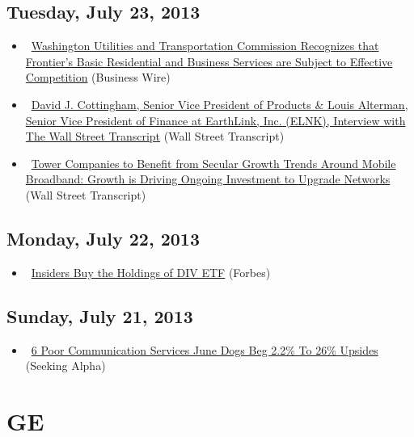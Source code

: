 \documentclass[11pt,asymmetric]{article}
\begin{document}
\subsection*{Tuesday, July 23, 2013}
\begin{itemize}
\item\ \href{http://finance.yahoo.com/news/washington-utilities-transportation-commission-recognizes-184800114.html}{Washington Utilities and Transportation Commission Recognizes that Frontier’s Basic Residential and Business Services are Subject to Effective Competition} (Business Wire)
\item\ \href{http://finance.yahoo.com/news/david-j-cottingham-senior-vice-164600236.html}{David J. Cottingham, Senior Vice President of Products \& Louis Alterman, Senior Vice President of Finance at EarthLink, Inc. (ELNK), Interview with The Wall Street Transcript} (Wall Street Transcript)
\item\ \href{http://finance.yahoo.com/news/tower-companies-benefit-secular-growth-155300700.html}{Tower Companies to Benefit from Secular Growth Trends Around Mobile Broadband: Growth is Driving Ongoing Investment to Upgrade Networks} (Wall Street Transcript)
\end{itemize}
\subsection*{Monday, July 22, 2013}
\begin{itemize}
\item\ \href{http://www.forbes.com/sites/etfchannel/2013/07/22/insiders-buy-the-holdings-of-div-etf-2/?partner=yahootix}{Insiders Buy the Holdings of DIV ETF} (Forbes)
\end{itemize}
\subsection*{Sunday, July 21, 2013}
\begin{itemize}
\item\ \href{http://seekingalpha.com/article/1559992-6-poor-communication-services-june-dogs-beg-2-2-to-26-upsides?source=yahoo}{6 Poor Communication Services June Dogs Beg 2.2\% To 26\% Upsides} (Seeking Alpha)
\end{itemize}

\section*{GE}
\end{document}
